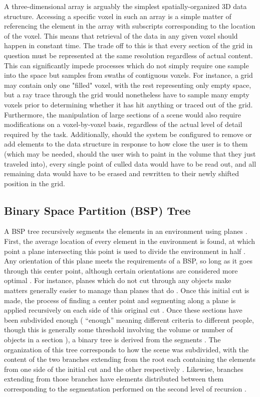 \documentclass[onecolumn, draftclsnofoot,10pt, compsoc]{IEEEtran}
\begin{document}
A three-dimensional array is arguably the simplest spatially-organized 3D data structure.
Accessing a specific voxel in such an array is a simple matter of referencing the element in the array with subscripts corresponding to the location of the voxel.
This means that retrieval of the data in any given voxel should happen in constant time.
The trade off to this is that every section of the grid in question must be represented at the same resolution regardless of actual content.
This can significantly impede processes which do not simply require one sample into the space but samples from swaths of contiguous voxels.
For instance, a grid may contain only one "filled" voxel, with the rest representing only empty space, but a ray trace through the grid would nonetheless have to sample many empty voxels prior to determining whether it has hit anything or traced out of the grid.
Furthermore, the manipulation of large sections of a scene would also require modifications on a voxel-by-voxel basis, regardless of the actual level of detail required by the task.
Additionally, should the system be configured to remove or add elements to the data structure in response to how close the user is to them (which may be needed, should the user wish to paint in the volume that they just traveled into), every single point of culled data would have to be read out, and all remaining data would have to be erased and rewritten to their newly shifted position in the grid. 



\subsection{Binary Space Partition (BSP) Tree}

A BSP tree recursively segments the elements in an environment using planes \cite{5}. 
First, the average location of every element in the environment is found, at which point a plane intersecting this point is used to divide the environment in half \cite{5}.
Any orientation of this plane meets the requirements of a BSP, so long as it goes through this center point, although certain orientations are considered more optimal \cite{5}.
For instance, planes which do not cut through any objects make matters generally easier to manage than planes that do \cite{5}.
Once this initial cut is made, the process of finding a center point and segmenting along a plane is applied recursively on each side of this original cut \cite{5}.
Once these sections have been subdivided enough ( “enough” meaning different criteria to different people, though this is generally some threshold involving the volume or number of objects in a section ), a binary tree is derived from the segments \cite{5}.
The organization of this tree corresponds to how the scene was subdivided, with the content of the two branches extending from the root each containing the elements from one side of the initial cut and the other respectively \cite{5}.
Likewise, branches extending from those branches have elements distributed between them corresponding to the segmentation performed on the second level of recursion \cite{5}.
\end{document}
